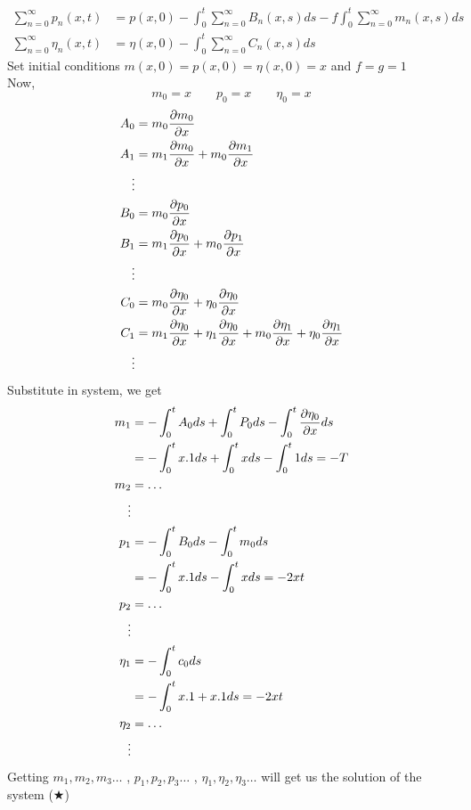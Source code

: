 \documentclass[]{article}
\begin{document}
\begin{example}
\begin{align*}
        \\
        \sum_{n=0}^{\infty} p_n(x,t)    & = p(x,0) - \int_{0}^{t} \sum_{n=0}^{\infty} B_n(x,s)  ds - f\int_{0}^{t} \sum_{n=0}^{\infty} m_n(x,s) ds
        \\
        \sum_{n=0}^{\infty} \eta_n(x,t) & = \eta(x,0) - \int_{0}^{t} \sum_{n=0}^{\infty} C_n(x,s)ds
    \end{align*}
    \newpage
    Set initial conditions $m(x,0)=p(x,0)=\eta(x,0) = x$ and $f = g = 1$\\
    Now,
    \begin{equation*}
        m_0 = x \qquad p_0 = x \qquad \eta_0 = x
    \end{equation*}
    \begin{align*}
        A_0 & = m_0 \pdv{m_0}{x}
        \\
        A_1 & = m_1 \pdv{m_0}{x} + m_0 \pdv{m_1}{x}
        \\
        \vdots
        \\
        B_0 & = m_0 \pdv{p_0}{x}
        \\
        B_1 & = m_1 \pdv{p_0}{x} + m_0 \pdv{p_1}{x}
        \\
        \vdots
        \\
        C_0 & = m_0 \pdv{\eta_0}{x} + \eta_0 \pdv{\eta_0}{x}
        \\
        C_1 & = m_1 \pdv{\eta_0}{x} + \eta_1 \pdv{\eta_0}{x}+ m_0 \pdv{\eta_1}{x} + \eta_0 \pdv{\eta_1}{x}
        \\
        \vdots
    \end{align*}
    Substitute in system, we get
    \begin{align*}
        m_1    & = - \int_0^t A_0 ds + \int_0^t P_0 ds - \int_0^t \pdv{\eta_0}{x} ds
        \\
               & = - \int_0^t x.1 ds + \int_0^t x ds - \int_0^t 1 ds = -T
        \\
        m_2    & = \dots
        \\
        \vdots
        \\
        p_1    & = -\int_0^t B_0 ds - \int_0^t m_0 ds
        \\
               & = -\int_0^t x.1 ds - \int_0^t x ds = -2xt
        \\
        p_2    & = \dots
        \\
        \vdots
        \\
        \eta_1 & = -\int_0^t c_0 ds
        \\
               & = - \int_0^t x.1 + x.1 ds = -2xt
        \\
        \eta_2 & = \dots
        \\
        \vdots
    \end{align*}
    Getting $m_1,m_2,m_3\dots$ , $p_1,p_2,p_3\dots$ , $\eta_1,\eta_2,\eta_3\dots$ will get us the solution of the system ($\bigstar$)
\end{example}
\end{document}
